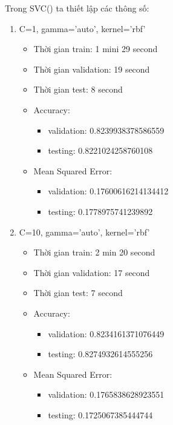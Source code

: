 \documentclass{article}
\begin{document}
Trong SVC() ta thiết lập các thông số:
\begin{enumerate}
	\item C=1, gamma='auto', kernel='rbf'
	      \begin{itemize}
		      \item Thời gian train: 1 mini 29 second
		      \item Thời gian validation: 19 second
		      \item Thời gian test: 8 second
		      \item Accuracy:
		            \begin{itemize}
			            \item validation: 0.8239938378586559
			            \item testing: 0.8221024258760108
		            \end{itemize}
		      \item Mean Squared Error:
		            \begin{itemize}
			            \item validation: 0.17600616214134412
			            \item testing: 0.1778975741239892
		            \end{itemize}
	      \end{itemize}
	\item C=10, gamma='auto', kernel='rbf'
	      \begin{itemize}
		      \item Thời gian train: 2 min 20 second
		      \item Thời gian validation: 17 second
		      \item Thời gian test: 7 second
		      \item Accuracy:
		            \begin{itemize}
			            \item validation: 0.8234161371076449
			            \item testing: 0.8274932614555256
		            \end{itemize}
		      \item Mean Squared Error:
		            \begin{itemize}
			            \item validation: 0.1765838628923551
			            \item testing: 0.1725067385444744
		            \end{itemize}
	      \end{itemize}
\end{enumerate}
\end{document}
